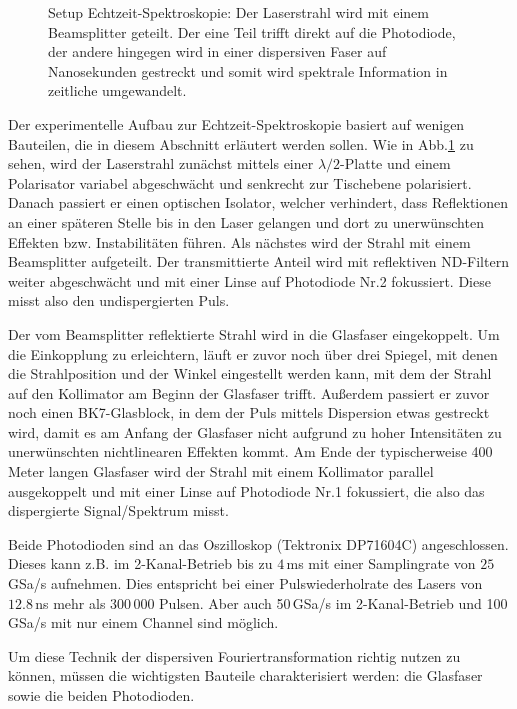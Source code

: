 \documentclass[bachelor,       %
               twoside,        %
               BCOR10mm,       %
               liststotoc,nomtotoc,bibtotoc, %
               english,ngerman, %
               final,          %
               ]{GAUBM}
\begin{document}
\begin{figure}[!htb]
	\centering
	\def\svgwidth{\columnwidth}
	
	\caption{Setup Echtzeit-Spektroskopie: Der Laserstrahl wird mit einem Beamsplitter geteilt. Der eine Teil trifft direkt auf die Photodiode, der andere hingegen wird in einer dispersiven Faser auf Nanosekunden gestreckt und somit wird spektrale Information  in zeitliche  umgewandelt.}
	\label{fig:DFTSetup}
\end{figure}
Der experimentelle Aufbau zur Echtzeit-Spektroskopie basiert auf wenigen Bauteilen, die in diesem Abschnitt erläutert werden sollen.
Wie in Abb.\ref{fig:DFTSetup} zu sehen, wird der Laserstrahl zunächst mittels einer $\lambda/2$-Platte und einem Polarisator variabel abgeschwächt und senkrecht zur Tischebene polarisiert.
Danach passiert er einen optischen Isolator, welcher verhindert, dass Reflektionen an einer späteren Stelle bis in den Laser gelangen und dort zu unerwünschten Effekten bzw. Instabilitäten führen.
Als nächstes wird der Strahl mit einem Beamsplitter aufgeteilt.
Der transmittierte Anteil wird mit reflektiven ND-Filtern weiter abgeschwächt und mit einer Linse auf Photodiode Nr.2 fokussiert.
Diese misst also den undispergierten Puls.

Der vom Beamsplitter reflektierte Strahl wird in die Glasfaser eingekoppelt.
Um die Einkopplung zu erleichtern, läuft er zuvor noch über drei Spiegel, mit denen die Strahlposition und der Winkel eingestellt werden kann, mit dem der Strahl auf den Kollimator am Beginn der Glasfaser trifft.
Außerdem passiert er zuvor noch einen BK7-Glasblock, in dem der Puls mittels Dispersion etwas gestreckt wird, damit es am Anfang der Glasfaser nicht aufgrund zu hoher Intensitäten zu unerwünschten nichtlinearen Effekten kommt.
Am Ende der typischerweise 400 Meter langen Glasfaser wird der Strahl mit einem Kollimator parallel ausgekoppelt und mit einer Linse auf Photodiode Nr.1 fokussiert, die also das dispergierte Signal/Spektrum misst.

Beide Photodioden sind an das Oszilloskop (Tektronix DP71604C) angeschlossen.
Dieses kann z.B. im 2-Kanal-Betrieb bis zu $4\,$ms mit einer Samplingrate von $25\,$GSa/s aufnehmen.
Dies entspricht bei einer Pulswiederholrate des Lasers von $12.8\,$ns mehr als 300\,000 Pulsen.
Aber auch 50\,GSa/s im 2-Kanal-Betrieb und 100\,GSa/s mit nur einem Channel sind möglich.

Um diese Technik der dispersiven Fouriertransformation richtig nutzen zu können, müssen die wichtigsten Bauteile charakterisiert werden: die Glasfaser sowie die beiden Photodioden.
\end{document}
